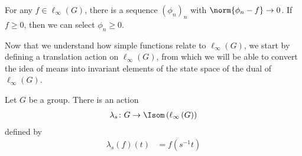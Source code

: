 \begin{corollary}
  For any $f\in \ell_{\infty}\left(G\right)$, there is a sequence $\left(\phi_n\right)_n$ with $\norm{\phi_n -f}\rightarrow 0$. If $f\geq 0$, then we can select $\phi_n\geq 0$.
\end{corollary}
Now that we understand how simple functions relate to $\ell_{\infty}(G)$, we start by defining a translation action on $\ell_{\infty}(G)$, from which we will be able to convert the idea of means into invariant elements of the state space of the dual of $\ell_{\infty}\left(G\right)$.
\begin{proposition}\label{prop:translation_action}
  Let $G$ be a group. There is an action
  \begin{align*}
    \lambda_s\colon G\rightarrow \Isom\left(\ell_{\infty}\left(G\right)\right)
  \end{align*}
  defined by
  \begin{align*}
    \lambda_{s}\left(f\right)\left(t\right) &= f\left(s^{-1}t\right)
  \end{align*}
\end{proposition}
